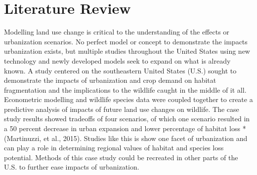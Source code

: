 \documentclass[20pt]{article}
\begin{document}
\section{Literature Review}
Modelling land use change is critical to the understanding of the effects or urbanization scenarios. No perfect model or concept to demonstrate the impacts urbanization exists, but multiple studies throughout the United States using new technology and newly developed models seek to expand on what is already known. A study centered on the southeastern United States (U.S.) sought to demonstrate the impacts of urbanization and crop demand on habitat fragmentation and the implications to the wildlife caught in the middle of it all. Econometric modelling and wildlife species data were coupled together to create a predictive analysis of impacts of future land use changes on wildlife. The case study results showed tradeoffs of four scenarios, of which one scenario resulted in a 50 percent decrease in urban expansion and lower percentage of habitat loss *(Martinuzzi, et al., 2015). Studies like this is show one facet of urbanization and can play a role in determining regional values of habitat and species loss potential. Methods of this case study could be recreated in other parts of the U.S. to further ease impacts of urbanization.\\ 
\end{document}
